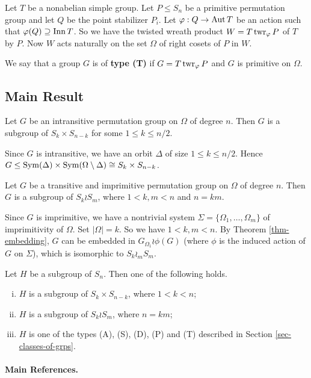 Let $T$ be a nonabelian simple group. Let $P\leq S_n$ be a primitive permutation group and let $Q$ be the point stabilizer $P_i$. Let $\varphi:Q\rightarrow \operatorname{Aut} T$ be an action such that $\varphi(Q)\supseteq \operatorname{Inn} T$. So we have the twisted wreath product $W=T\operatorname{twr}_\varphi P$ of $T$ by $P$. Now $W$ acts naturally on the set $\Omega$ of right cosets of $P$ in $W$.


 We say that a group $G$ is of \textbf{type (T)} if $G = T\operatorname{twr}_\varphi P$ and $G$ is primitive on $\Omega$. 


\subsection{Main Result}

\begin{proposition}
	Let $G$ be an intransitive permutation group on $\Omega$ of degree $n$. Then $G$ is  a subgroup of $S_k\times S_{n-k}$ for some $1\leq k\leq n/2$.
\end{proposition}
\begin{sketch}
	Since $G$ is intransitive, we have an orbit $\Delta$ of size $1\leq k\leq n/2$. Hence $G \leq \operatorname{Sym}(\Delta) \times \operatorname{Sym}(\Omega\setminus \Delta) \cong S_k \times S_{n-k}$.
\end{sketch}



\begin{proposition}
	Let $G$ be a transitive and imprimitive permutation group on $\Omega$ of degree $n$. Then $G$ is a subgroup of $S_k \wr S_m$, where $1<k,m<n$ and $n = km$.
\end{proposition}
\begin{sketch}
	Since $G$ is imprimitive, we have a nontrivial system $\Sigma =\{\Omega_1,\dots, \Omega_m\}$ of imprimitivity of $\Omega$. Set $|\Omega| = k$. So we have $1<k,m<n$. By Theorem \ref{thm-embedding}, $G$ can be embedded in $G_{\Omega_1}\wr\phi(G)$ (where $\phi$ is the induced action of $G$ on $\Sigma$), which is isomorphic to $S_k \wr_m S_m$.
\end{sketch}



\begin{theorem}
	 Let $H$ be a subgroup of $S_n$. Then one of the following holds.
	\begin{enumerate}[(i)]
		\item $H$ is a subgroup of $S_k \times S_{n-k}$, where $1<k<n$;
		\item $H$ is a subgroup of $S_k \wr S_m$, where $n = km$;
		\item $H$ is one of the types (A), (S), (D), (P) and (T) described in Section \ref{sec-classes-of-grps}.
	\end{enumerate}
\end{theorem}



\paragraph{Main References.} \cite{Wilson2009,Cameron1999,Smith2018,Liebeck1988,Aschbacher1985}